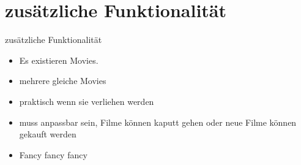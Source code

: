 \documentclass{beamer} %
\begin{document}
\section{zusätzliche Funktionalität}
\begin{frame}{zusätzliche Funktionalität}
	\begin{itemize}
		\item Es existieren Movies.\pause
		\item mehrere gleiche Movies\pause
		\item praktisch wenn sie verliehen werden\pause
		\item muss anpassbar sein, Filme können kaputt gehen oder neue Filme können gekauft werden\pause
		\item Fancy fancy fancy
	\end{itemize}
\end{frame}

\section{}
\begin{frame}
\end{frame}
\end{document}
